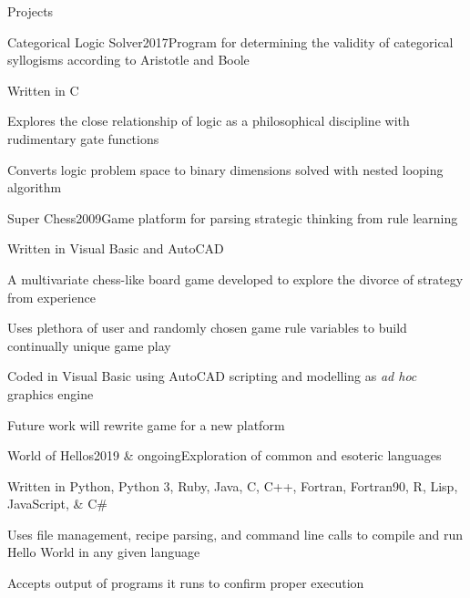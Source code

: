 \documentclass{resume} %
\begin{document}
\begin{rSection}{Projects}


\begin{rWorkSubsection}{Categorical Logic Solver}{2017}{Program for determining the validity of categorical syllogisms according to Aristotle and Boole}{}
\item Written in C
\item Explores the close relationship of logic as a philosophical discipline with rudimentary gate functions
\item Converts logic problem space to binary dimensions solved with nested looping algorithm
\end{rWorkSubsection}


\begin{rWorkSubsection}{Super Chess}{2009}{Game platform for parsing strategic thinking from rule learning}{}
\item Written in Visual Basic and AutoCAD
\item A multivariate chess-like board game developed to explore the divorce of strategy from experience
\item Uses plethora of user and randomly chosen game rule variables to build continually unique game play
\item Coded in Visual Basic using AutoCAD scripting and modelling as {\em ad hoc} graphics engine
\item Future work will rewrite game for a new platform
\end{rWorkSubsection}


\begin{rWorkSubsection}{World of Hellos}{2019 \& ongoing}{Exploration of common and esoteric languages}{}
\item Written in Python, Python 3, Ruby, Java, C, C++, Fortran, Fortran90, R, Lisp, JavaScript, \& C\#
\item Uses file management, recipe parsing, and command line calls to compile and run Hello World in any given language
\item Accepts output of programs it runs to confirm proper execution
\end{rWorkSubsection}



\end{rSection}
\end{document}
